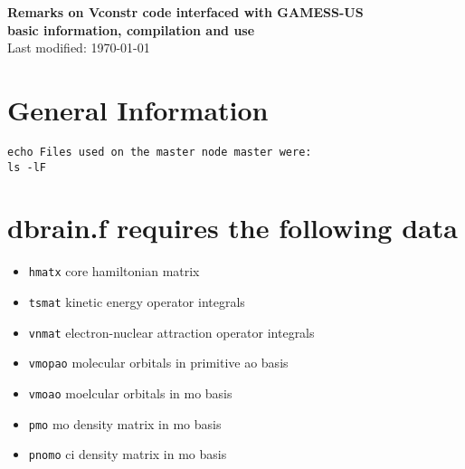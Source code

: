 \documentclass[10pt]{article}
\begin{document}
\thispagestyle{first}
\footnotesize

\begin{center}
    \Large{\textbf{Remarks on Vconstr code interfaced with GAMESS-US}} \\ 
    \normalsize{\textbf{basic information, compilation and use}} \\
    \normalsize{Last modified: \today}
\end{center}

\section{General Information}
\begin{verbatim}
echo Files used on the master node master were:
ls -lF 
\end{verbatim}
\section{dbrain.f requires the following data}
    \begin{itemize}
        \item \verb!hmatx! core hamiltonian matrix 
        \item \verb!tsmat! kinetic energy operator integrals
        \item \verb!vnmat! electron-nuclear attraction operator integrals
        \item \verb!vmopao! molecular orbitals in primitive ao basis
        \item \verb!vmoao! moelcular orbitals in mo basis
        \item \verb!pmo! mo density matrix in mo basis
        \item \verb!pnomo! ci density matrix in mo basis  
    \end{itemize}
\end{document}
